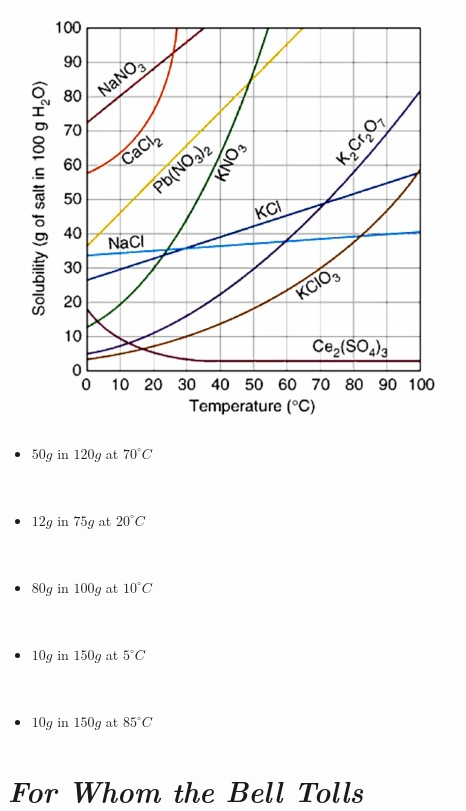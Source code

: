 \documentclass[11pt, letterpaper]{memoir}
\begin{document}
{  \noindent
  \begin{minipage}{0.4\linewidth}
    \includegraphics[width=\linewidth]{Solubilities}
  \end{minipage}
  \begin{minipage}{0.6\linewidth}
    \begin{itemize}
      \item $50g$  in $120g$  at $70^\circ C$ 

        ~
      \item $12g$  in $75g$  at $20^\circ C$ 

        ~
      \item $80g$  in $100g$  at $10^\circ C$ 

        ~
      \item $10g$  in $150g$  at $5^\circ C$ 

        ~
      \item $10g$  in $150g$  at $85^\circ C$ 
    \end{itemize}
  \end{minipage}
	\newpage
	\pagestyle{empty}
	\addtocounter{page}{-1}
  \section*{\emph{For Whom the Bell Tolls}}
}
\end{document}

